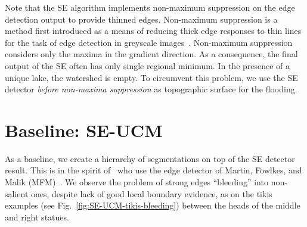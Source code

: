 Note that the SE algorithm implements non-maximum suppression on the edge detection output to provide thinned edges. Non-maximum suppression is a method first introduced as a means of reducing thick edge responses to thin lines for the task of edge detection in greyscale images~\cite{rosenfeld1976digital}. Non-maximum suppression considers only the maxima in the gradient direction. As a consequence, the final output of the SE often has only single regional minimum. In the presence of a unique lake, the watershed is empty. To circumvent this problem, we use the SE detector \textit{before non-maxima suppression} as topographic surface for the flooding.

\section{Baseline: SE-UCM}
As a baseline, we create a hierarchy of segmentations on top of the SE detector result. This is in the spirit of~\cite{arbelaez2006boundary} who use the edge detector of Martin, Fowlkes, and Malik (MFM)~\cite{martin2004learning}.
We observe the problem of strong edges ``bleeding'' into non-salient ones, despite lack of good local boundary evidence, as on the tikis examples (see Fig.~\ref{fig:SE-UCM-tikis-bleeding}) between the heads of the middle and right statues.

